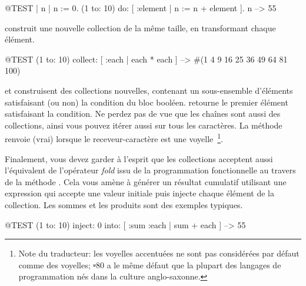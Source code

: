 \documentclass[a4paper,10pt,twoside]{book}
\begin{document}
\begin{code}{@TEST | n |}
n := 0.
(1 to: 10) do: [ :element | n := n + element ].
n --> 55
\end{code}

 construit une nouvelle collection de la m\^{e}me taille, en transformant chaque \'{e}l\'{e}ment.
\begin{code}{@TEST}
(1 to: 10) collect: [ :each | each * each ] --> #(1 4 9 16 25 36 49 64 81 100)
\end{code}

 et  construisent des collections nouvelles, contenant un sous-ensemble d'\'{e}l\'{e}ments satisfaisant (ou non) la condition du bloc bool\'{e}en.
 retourne le premier \'{e}l\'{e}ment satisfaisant la condition.
Ne perdez pas de vue que les chaînes sont aussi des collections, ainsi
vous pouvez it\'{e}rer aussi sur tous les caract\`{e}res.
La m\'ethode  renvoie  (\ie vrai)
lorsque le receveur-caract\`ere est une \label{def:isVowel}
voyelle~\footnote{Note du traducteur: les voyelles accentu\'ees ne sont
  pas consid\'er\'ees par d\'efaut comme des voyelles; \st-80 a le
  m\^eme d\'efaut que la plupart des langages de programmation n\'es
  dans la culture anglo-saxonne.}.


Finalement, vous devez garder \`{a} l'esprit que les collections
acceptent aussi l'\'equivalent de l'op\'erateur \emph{fold}
issu de la programmation fonctionnelle au travers de 
la m\'{e}thode .
Cela vous am\`{e}ne \`{a} g\'{e}n\'{e}rer un r\'{e}sultat cumulatif
utilisant une expression qui accepte une valeur initiale puis 
injecte chaque \'{e}l\'{e}ment de la collection.
Les sommes et les produits sont des exemples typiques.

\begin{code}{@TEST}
(1 to: 10) inject: 0 into: [ :sum :each | sum + each ] --> 55
\end{code}
\end{document}
